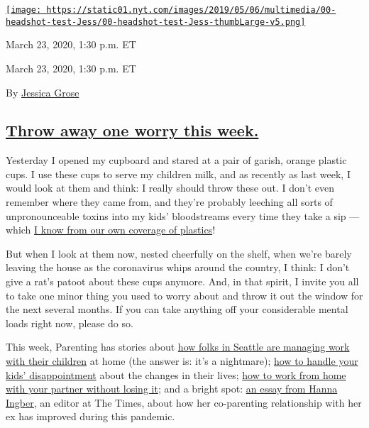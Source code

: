 \href{https://www.nytimes.com/by/jessica-grose}{\texttt{[image: https://static01.nyt.com/images/2019/05/06/multimedia/00-headshot-test-Jess/00-headshot-test-Jess-thumbLarge-v5.png]}}

March 23, 2020, 1:30 p.m. ET

March 23, 2020, 1:30 p.m. ET

By \href{https://www.nytimes.com/by/jessica-grose}{Jessica Grose}

\hypertarget{throw-away-one-worry-this-week}{%
\subsection{\texorpdfstring{\protect\hyperlink{throw-away-one-worry-this-week}{Throw
away one worry this
week.}}{Throw away one worry this week.}}\label{throw-away-one-worry-this-week}}

Yesterday I opened my cupboard and stared at a pair of garish, orange
plastic cups. I use these cups to serve my children milk, and as
recently as last week, I would look at them and think: I really should
throw these out. I don't even remember where they came from, and they're
probably leeching all sorts of unpronounceable toxins into my kids'
bloodstreams every time they take a sip --- which
\href{https://parenting.nytimes.com/childrens-health/plastics-to-avoid}{I
know from our own coverage of plastics}!

But when I look at them now, nested cheerfully on the shelf, when we're
barely leaving the house as the coronavirus whips around the country, I
think: I don't give a rat's patoot about these cups anymore. And, in
that spirit, I invite you all to take one minor thing you used to worry
about and throw it out the window for the next several months. If you
can take anything off your considerable mental loads right now, please
do so.

This week, Parenting has stories about
\href{https://www.nytimes.com/2020/03/17/parenting/seattle-child-care.html?type=roundup\&link=intro}{how
folks in Seattle are managing work with their children} at home (the
answer is: it's a nightmare);
\href{https://www.nytimes.com/2020/03/18/parenting/coronavirus-kids-events-cancelled.html?type=roundup\&link=intro}{how
to handle your kids' disappointment} about the changes in their lives;
\href{https://www.nytimes.com/2020/03/20/parenting/coronavirus-work-from-home-spouse.html?type=roundup\&link=cta}{how
to work from home with your partner without losing it}; and a bright
spot:
\href{https://www.nytimes.com/2020/03/20/parenting/coronavirus-divorce-coparenting.html?type=roundup\&link=intro}{an
essay from Hanna Ingber,} an editor at The Times, about how her
co-parenting relationship with her ex has improved during this pandemic.

